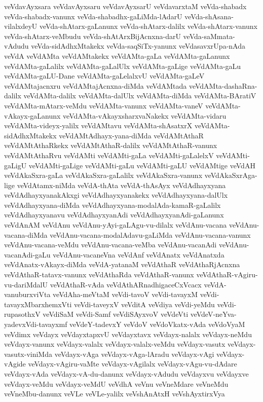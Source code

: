 {veVdavAyxsara
veVdavAyxsaru
veVdavAyxsarU
veVdavarxtaM
veVda-shabadx
veVda-shabadx-vanunx
veVda-shabadhx-gaLiMda-lAdarU
veVda-shAsana-vilalxdeyU
veVda-shAtarx-gaLanunx
veVda-shAtarx-dalilx
veVda-shAtarx-vanunx
veVda-shAtarx-veMbudu
veVda-shAtArxBijAcnxna-darU
veVda-saMmata-vAdudu
veVda-sidAdhxMtakekx
veVda-saqSiTx-yanunx
veVdasavxrUpa-nAda
veVdA
veVdAMta
veVdAMtakekx
veVdAMta-gaLa
veVdAMta-gaLanunx
veVdAMta-gaLalilx
veVdAMta-gaLalUlx
veVdAMta-gaLige
veVdAMta-gaLu
veVdAMta-gaLU-Dane
veVdAMta-gaLelalxvU
veVdAMta-gaLeV
veVdAMtajacnxru
veVdAMtajAcnxna-diMda
veVdAMtada
veVdAMta-dashaRna-dalilx
veVdAMta-dalilx
veVdAMta-dalUlx
veVdAMta-diMda
veVdAMta-BAratiV
veVdAMta-mAtarx-veMdu
veVdAMta-vanunx
veVdAMta-vaneV
veVdAMta-vAkayx-gaLanunx
veVdAMta-vAkayxsharxvaNakekx
veVdAMta-vidaru
veVdAMta-videyx-yalilx
veVdAMtavu
veVdAMta-shAsatxrX
veVdAMta-sidAdhxMtakekx
veVdAMtAdhayx-yana-diMda
veVdAMtAthaR
veVdAMtAthaRkekx
veVdAMtAthaR-dalilx
veVdAMtAthaR-vanunx
veVdAMtAthaRvu
veVdAMti
veVdAMti-gaLa
veVdAMti-gaLalelxV
veVdAMti-gaLigU
veVdAMti-gaLige
veVdAMti-gaLu
veVdAMti-gaLU
veVdAMtige
veVdAH
veVdAkaSxra-gaLa
veVdAkaSxra-gaLalilx
veVdAkaSxra-vanunx
veVdAkaSxrAga-lige
veVdAtamx-niMda
veVdA-thAta
veVdA-thAsAyx
veVdAdhayxyana
veVdAdhayxyanakAkxgi
veVdAdhayxyanakekx
veVdAdhayxyana-dalUlx
veVdAdhayxyana-diMda
veVdAdhayxyana-modalAda-kamaR-gaLalilx
veVdAdhayxyanavu
veVdAdhayxyanAdi
veVdAdhayxyanAdi-gaLanunx
veVdAnAM
veVdAnu
veVdAnu-yAyi-gaLAgu-vu-dilalx
veVdAnu-vacana
veVdAnu-vacana-diMda
veVdAnu-vacana-modalAdavu-gaLiMda
veVdAnu-vacana-vanunx
veVdAnu-vacana-veMdu
veVdAnu-vacana-veMba
veVdAnu-vacanAdi
veVdAnu-vacanAdi-gaLu
veVdAnu-vacaneVna
veVdAnf
veVdAnatx
veVdAnatxda
veVdAnatx-vAkayx-diMda
veVdA-yatanaM
veVdAthaR
veVdAthaRjAcnxna
veVdAthaR-tatavx-vanunx
veVdAthaRda
veVdAthaR-vanunx
veVdAthaR-vAgiru-vu-dariMdalU
veVdAthaR-vAda
veVdAthARnadhigaceCxVcacx
veVdA-vanuburxviVta
veVdAha-meVtaM
veVdi-tavoV
veVdi-tavayxM
veVdi-tavayxMbarxhemxVti
veVdi-taveyxV
veVditA
veVdiya
veVdi-yeMdu
veVdi-rupasothxV
veVdiSaM
veVdi-Samf
veVdiSAyxvoV
veVdeVti
veVdeV-neYva-yadevxVdi-tavayxmf
veVdeY-tadevxY
veVdoV
veVdoVkatx-vAda
veVdoVyaM
veVdimx
veVdayx
veVdayxtapxvU
veVdayxtavx
veVdayx-nalalx
veVdayx-neMdu
veVdayx-vanunx
veVdayx-valalx
veVdayx-valalx-veMdu
veVdayx-vasutx
veVdayx-vasutx-viniMda
veVdayx-vAga
veVdayx-vAga-lAradu
veVdayx-vAgi
veVdayx-vAgide
veVdayx-vAgiru-vaMte
veVdayx-vAgilalx
veVdayx-vAgu-vu-dAdare
veVdayx-vAda
veVdayx-vA-du-danunx
veVdayx-vAdudu
veVdayxvu
veVdayxve
veVdayx-veMdu
veVdayx-veMdU
veVdhA
veVnu
veVneMdare
veVneMdu
veVneMbu-danunx
veVLe
veVLe-yalilx
veVshAnAtxH
veVshAyxtirxVya
}
